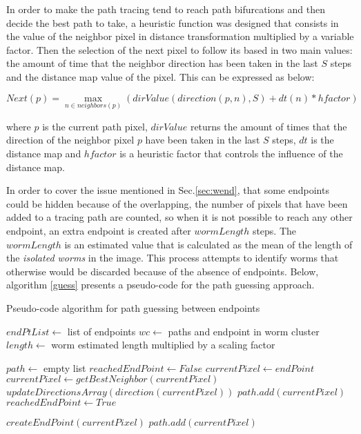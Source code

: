 In order to make the path tracing tend to reach path bifurcations and then decide the best
path to take, a heuristic function was designed that consists in the value of the neighbor pixel
in distance transformation multiplied by a variable factor.
Then the selection of the next pixel to follow its based in two main values:
the amount of time that the neighbor direction has been taken in the last $S$ steps and
the distance map value of the pixel. This can be expressed as below:

$$Next(p) = \max_{n \in neighbors(p)} (dirValue(direction(p,n),S) + dt(n)*hfactor)$$

where $p$ is the current path pixel, $dirValue$ returns the amount of times that the 
direction of the neighbor pixel $p$ have been taken in the last $S$ steps, $dt$ is the 
distance map and $hfactor$ is a heuristic factor that controls the influence of the
distance map.

In order to cover the issue mentioned in Sec.\ref{sec:wend}, that some endpoints could
be hidden because of the overlapping, the number of pixels that have been added
to a tracing path are counted, so when it is not possible to reach any other endpoint,
an extra endpoint is created after $wormLength$ steps. 
The $wormLength$ is an estimated value that is calculated
as the mean of the length of the \emph{isolated worms} in the image. This process
attempts to identify worms that otherwise would be discarded because of the absence
of endpoints. Below, algorithm \ref{guess} presents a pseudo-code for the path
guessing approach.

\begin{algorithm}                     
\caption{Pseudo-code algorithm for path guessing between endpoints}         
\label{guess}                    
\begin{algorithmic}                   

\STATE $endPtList \leftarrow$ list of endpoints
\STATE $wc \leftarrow$ paths and endpoint in worm cluster 
\STATE $length \leftarrow$ worm estimated length multiplied by a scaling factor
\STATE {}
\ENDIF
{}

\STATE $path \leftarrow$ empty list
\STATE $reachedEndPoint \leftarrow False$
\STATE $currentPixel \leftarrow endPoint$
\STATE $currentPixel \leftarrow getBestNeighbor(currentPixel)$
\STATE $updateDirectionsArray(direction(currentPixel))$
\STATE $path.add(currentPixel)$
\STATE $reachedEndPoint \leftarrow True$
\ENDIF
\ENDWHILE 

\STATE $createEndPoint(currentPixel)$
\STATE $path.add(currentPixel)$
\ELSE
\STATE {}
\ENDIF
\ENDIF
\ENDFOR

\end{algorithmic}
\end{algorithm}

